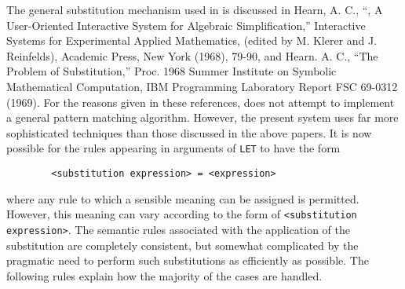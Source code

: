 The general substitution mechanism used in {\REDUCE} is discussed in Hearn, A.
C., ``{\REDUCE}, A User-Oriented Interactive System for Algebraic
Simplification,'' Interactive Systems for Experimental Applied Mathematics,
(edited by M. Klerer and J. Reinfelds), Academic Press, New York (1968),
79-90, and Hearn. A. C., ``The Problem of Substitution,'' Proc. 1968 Summer
Institute on Symbolic Mathematical Computation, IBM Programming Laboratory
Report FSC 69-0312 (1969). For the reasons given in these
references, {\REDUCE} does not attempt to implement a general pattern
matching algorithm.  However, the present system uses far more sophisticated
techniques than those discussed in the above papers.  It is now possible for
the rules appearing in arguments of {\tt LET} to have the form
\begin{verbatim}
        <substitution expression> = <expression>
\end{verbatim}
where any rule to which a sensible meaning can be assigned is permitted.
However, this meaning can vary according to the form of {\tt <substitution
expression>}. The semantic rules associated with the application of the
substitution are completely consistent, but somewhat complicated by the
pragmatic need to perform such substitutions as efficiently as possible.
The following rules explain how the majority of the cases are handled.

